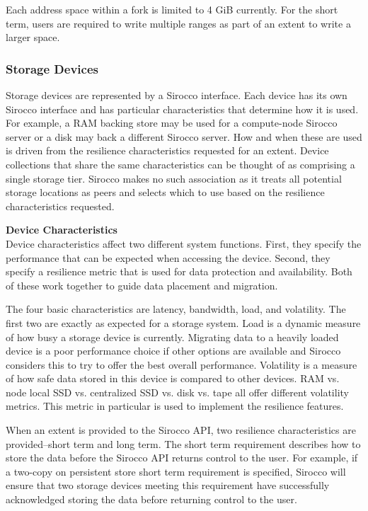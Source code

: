 Each address space within a fork is limited to 4 GiB currently. For the short
term, users are required to write multiple ranges as part of an extent to write
a larger space.

\subsubsection{Storage Devices}
Storage devices are represented by a Sirocco interface. Each device has its own
Sirocco interface and has particular characteristics that determine how it is
used. For example, a RAM backing store may be used for a compute-node Sirocco
server or a disk may back a different Sirocco server. How and when these are
used is driven from the resilience characteristics requested for an extent.
Device collections that share the same characteristics can be thought of as
comprising a single storage tier. Sirocco makes no such association as it
treats all potential storage locations as peers and selects which to use based
on the resilience characteristics requested.

\noindent\textbf{Device Characteristics}\\
Device characteristics affect two different system functions. First, they
specify the performance that can be expected when accessing the device. Second,
they specify a resilience metric that is used for data protection and
availability. Both of these work together to guide data placement and
migration.

The four basic characteristics are latency, bandwidth, load, and volatility.
The first two are exactly as expected for a storage system. Load is a dynamic
measure of how busy a storage device is currently. Migrating data to a heavily
loaded device is a poor performance choice if other options are available and
Sirocco considers this to try to offer the best overall performance. Volatility
is a measure of how safe data stored in this device is compared to other
devices. RAM vs. node local SSD vs. centralized SSD vs. disk vs. tape all offer
different volatility metrics. This metric in particular is used to implement
the resilience features.

When an extent is provided to the Sirocco API, two resilience characteristics
are provided--short term and long term. The short term requirement describes
how to store the data before the Sirocco API returns control to the user. For
example, if a two-copy on persistent store short term requirement is specified,
Sirocco will ensure that two storage devices meeting this requirement have
successfully acknowledged storing the data before returning control to the
user.

